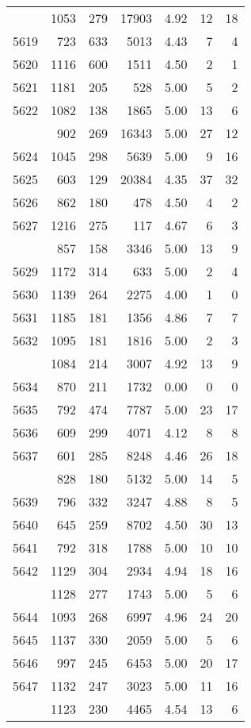 \documentclass[
]{article}
\begin{document}
\begin{table}
\begin{tabular}[t]{lrrrrrr}
\addlinespace
5618 & 1053 & 279 & 17903 & 4.92 & 12 & 18\\
5619 & 723 & 633 & 5013 & 4.43 & 7 & 4\\
5620 & 1116 & 600 & 1511 & 4.50 & 2 & 1\\
5621 & 1181 & 205 & 528 & 5.00 & 5 & 2\\
5622 & 1082 & 138 & 1865 & 5.00 & 13 & 6\\
\addlinespace
5623 & 902 & 269 & 16343 & 5.00 & 27 & 12\\
5624 & 1045 & 298 & 5639 & 5.00 & 9 & 16\\
5625 & 603 & 129 & 20384 & 4.35 & 37 & 32\\
5626 & 862 & 180 & 478 & 4.50 & 4 & 2\\
5627 & 1216 & 275 & 117 & 4.67 & 6 & 3\\
\addlinespace
5628 & 857 & 158 & 3346 & 5.00 & 13 & 9\\
5629 & 1172 & 314 & 633 & 5.00 & 2 & 4\\
5630 & 1139 & 264 & 2275 & 4.00 & 1 & 0\\
5631 & 1185 & 181 & 1356 & 4.86 & 7 & 7\\
5632 & 1095 & 181 & 1816 & 5.00 & 2 & 3\\
\addlinespace
5633 & 1084 & 214 & 3007 & 4.92 & 13 & 9\\
5634 & 870 & 211 & 1732 & 0.00 & 0 & 0\\
5635 & 792 & 474 & 7787 & 5.00 & 23 & 17\\
5636 & 609 & 299 & 4071 & 4.12 & 8 & 8\\
5637 & 601 & 285 & 8248 & 4.46 & 26 & 18\\
\addlinespace
5638 & 828 & 180 & 5132 & 5.00 & 14 & 5\\
5639 & 796 & 332 & 3247 & 4.88 & 8 & 5\\
5640 & 645 & 259 & 8702 & 4.50 & 30 & 13\\
5641 & 792 & 318 & 1788 & 5.00 & 10 & 10\\
5642 & 1129 & 304 & 2934 & 4.94 & 18 & 16\\
\addlinespace
5643 & 1128 & 277 & 1743 & 5.00 & 5 & 6\\
5644 & 1093 & 268 & 6997 & 4.96 & 24 & 20\\
5645 & 1137 & 330 & 2059 & 5.00 & 5 & 6\\
5646 & 997 & 245 & 6453 & 5.00 & 20 & 17\\
5647 & 1132 & 247 & 3023 & 5.00 & 11 & 16\\
\addlinespace
5648 & 1123 & 230 & 4465 & 4.54 & 13 & 6\\

\end{tabular}
\end{table}
\end{document}
